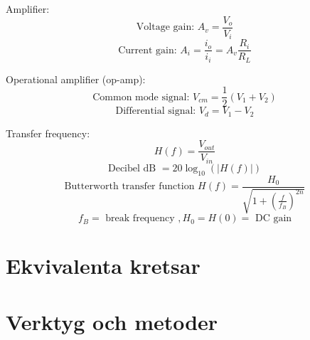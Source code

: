 \documentclass{article}
\begin{document}
Amplifier:
\[ \textrm{Voltage gain: } A_v = \frac{V_o}{V_i} \]
\[ \textrm{Current gain: } A_i = \frac{i_o}{i_i} = A_v \frac{R_i}{R_L} \]

Operational amplifier (op-amp):
\[ \textrm{Common mode signal: } V_{cm} = \frac{1}{2}(V_1 + V_2) \]
\[ \textrm{Differential signal: } V_d = V_1 - V_2 \]

Transfer frequency:
\[ H(f) = \frac{V_{out}}{V_{in}} \]
\[ \textrm{Decibel dB } = 20 \log_{10}(|H(f)|) \]
\[ \textrm{Butterworth transfer function } H(f) = \frac{H_0}{\sqrt{1 + \left( \frac{f}{f_B} \right)^{2n}}} \]
\[ f_B = \textrm{ break frequency }, H_0 = H(0) = \textrm{ DC gain} \]


\section{Ekvivalenta kretsar}


\section{Verktyg och metoder}

\end{document}
